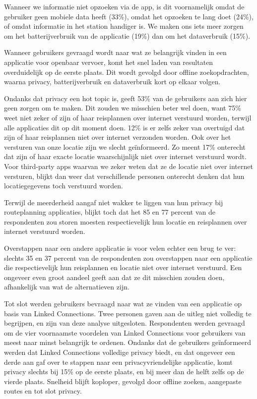 Wanneer we informatie niet opzoeken via de app, is dit voornamelijk omdat de gebruiker geen mobiele data heeft (33\%), omdat het opzoeken te lang doet (24\%), of omdat informatie in het station handiger is. We maken ons iets meer zorgen om het batterijverbruik van de applicatie (19\%) dan om het dataverbruik (15\%).

Wanneer gebruikers gevraagd wordt naar wat ze belangrijk vinden in een applicatie voor openbaar vervoer, komt het snel laden van resultaten overduidelijk op de eerste plaats. Dit wordt gevolgd door offline zoekopdrachten, waarna privacy, batterijverbruik en dataverbruik kort op elkaar volgen.

Ondanks dat privacy een hot topic is, geeft 53\% van de gebruikers aan zich hier geen zorgen om te maken. Dit zouden we misschien beter wel doen, want 75\% weet niet zeker of zijn of haar reisplannen over internet verstuurd worden, terwijl alle applicaties dit op dit moment doen. 12\% is er zelfs zeker van overtuigd dat zijn of haar reisplannen niet over internet verzonden worden. Ook over het versturen van onze locatie zijn we slecht geïnformeerd. Zo meent 17\% onterecht dat zijn of haar exacte locatie waarschijnlijk niet over internet verstuurd wordt. Voor third-party apps waarvan we zeker weten dat ze de locatie niet over internet versturen, blijkt dan weer dat verschillende personen onterecht denken dat hun locatiegegevens toch verstuurd worden. 

Terwijl de meerderheid aangaf niet wakker te liggen van hun privacy bij routeplanning applicaties, blijkt toch dat het 85 en 77 percent van de respondenten zou storen moesten respectievelijk hun locatie en reisplannen over internet verstuurd worden.
 
Overstappen naar een andere applicatie is voor velen echter een brug te ver: slechts 35 en 37 percent van de respondenten zou overstappen naar een applicatie die respectievelijk hun reisplannen en locatie niet over internet verstuurd. Een ongeveer even groot aandeel geeft aan dat ze dit misschien zouden doen, afhankelijk van wat de alternatieven zijn.

Tot slot werden gebruikers bevraagd naar wat ze vinden van een applicatie op basis van Linked Connections. Twee personen gaven aan de uitleg niet volledig te begrijpen, en zijn van deze analyse uitgesloten.
Respondenten werden gevraagd om de vier voornaamste voordelen van Linked Connections voor gebruikers van meest naar minst belangrijk te ordenen. Ondanks dat de gebruikers geïnformeerd werden dat Linked Connections volledige privacy biedt, en dat ongeveer een derde aan gaf over te stappen naar een privacyvriendelijke applicatie, komt privacy slechts bij 15\% op de eerste plaats, en bij meer dan de helft zelfs op de vierde plaats. Snelheid blijft koploper, gevolgd door offline zoeken, aangepaste routes en tot slot privacy.

